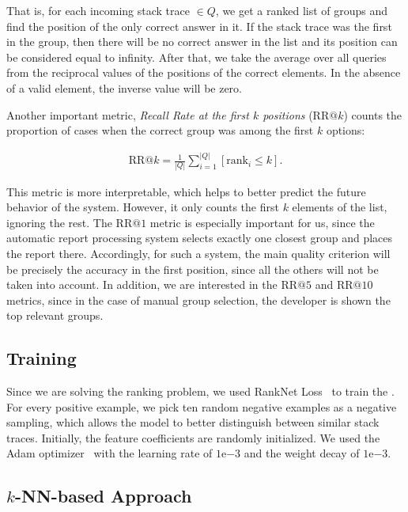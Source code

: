 That is, for each incoming stack trace $\in Q$, we get a ranked list of groups and find the position of the only correct answer in it.
If the stack trace was the first in the group, then there will be no correct answer in the list and its position can be considered equal to infinity.
After that, we take the average over all queries from the reciprocal values of the positions of the correct elements.
In the absence of a valid element, the inverse value will be zero.

Another important metric, \textit{Recall Rate at the first $k$ positions} ($\mathrm{RR} @ k$) counts the proportion of cases when the correct group was among the first $k$ options:

\begin{gather}
    \mathrm{RR}@k = \frac{1}{|Q|}\sum\limits_{i=1}^{|Q|}[\mathrm{rank}_i \leq k].
\end{gather}

This metric is more interpretable, which helps to better predict the future behavior of the system.
However, it only counts the first $k$ elements of the list, ignoring the rest.
The $\mathrm{RR} @ 1$ metric is especially important for us, since the automatic report processing system selects exactly one closest group and places the report there.
Accordingly, for such a system, the main quality criterion will be precisely the accuracy in the first position, since all the others will not be taken into account.
In addition, we are interested in the $\mathrm{RR} @ 5$ and $\mathrm{RR} @ 10$ metrics, since in the case of manual group selection, the developer is shown the top relevant groups.

\subsection{Training}

Since we are solving the ranking problem, we used RankNet Loss~\cite{ranknet} to train the \ag. For every positive example, we pick ten random negative examples as a negative sampling, which allows the model to better distinguish between similar stack traces.
Initially, the feature coefficients are randomly initialized. We used the Adam optimizer~\cite{adam} with the learning rate of $1\mathrm{e}{-3}$ and the weight decay of $1\mathrm{e}{-3}$.

\subsection{$k$-NN-based Approach}

